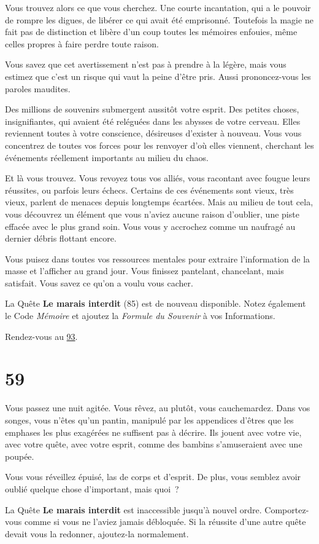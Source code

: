 \documentclass{report}
\newcommand{\gsection}[1]{
    \section{#1}
    \label{section-#1}
}
\newcommand{\glink}[1]{\hyperref[section-#1]{#1}}
\begin{document}
Vous trouvez alors ce que vous cherchez. Une courte incantation, qui a le pouvoir de rompre les digues, de libérer ce qui avait été emprisonné. Toutefois la magie ne fait pas de distinction et libère d'un coup toutes les mémoires enfouies, même celles propres à faire perdre toute raison.

Vous savez que cet avertissement n'est pas à prendre à la légère, mais vous estimez que c'est un risque qui vaut la peine d'être pris. Aussi prononcez-vous les paroles maudites.

Des millions de souvenirs submergent aussitôt votre esprit. Des petites choses, insignifiantes, qui avaient été reléguées dans les abysses de votre cerveau. Elles reviennent toutes à votre conscience, désireuses d'exister à nouveau. Vous vous concentrez de toutes vos forces pour les renvoyer d'où elles viennent, cherchant les événements réellement importants au milieu du chaos.

Et là vous trouvez. Vous revoyez tous vos alliés, vous racontant avec fougue leurs réussites, ou parfois leurs échecs. Certains de  ces événements sont vieux, très vieux, parlent de menaces depuis longtemps écartées. Mais au milieu de tout cela, vous découvrez un élément que vous n'aviez aucune raison d'oublier, une piste effacée avec le plus grand soin. Vous vous y accrochez comme un naufragé au dernier débris flottant encore.

Vous puisez dans toutes vos ressources mentales pour extraire l'information de la masse et l'afficher au grand jour. Vous finissez pantelant, chancelant, mais satisfait. Vous savez ce qu'on a voulu vous cacher.

La Quête \textbf{Le marais interdit} (85) est de nouveau disponible. Notez également le Code \emph{Mémoire} et ajoutez la \emph{Formule du Souvenir} à vos Informations.

Rendez-vous au \glink{93}.

\gsection{59}

Vous passez une nuit agitée. Vous rêvez, au plutôt, vous cauchemardez. Dans vos songes, vous n'êtes qu'un pantin, manipulé par les appendices d'êtres que les emphases les plus exagérées ne suffisent pas à décrire. Ils jouent avec votre vie, avec votre quête, avec votre esprit, comme des bambins s'amuseraient avec une poupée.

Vous vous réveillez épuisé, las de corps et d'esprit. De plus, vous semblez avoir oublié quelque chose d'important, mais quoi ?

La Quête \textbf{Le marais interdit} est inaccessible jusqu'à nouvel ordre. Comportez-vous comme si vous ne l'aviez jamais débloquée. Si la réussite d'une autre quête devait vous la redonner, ajoutez-la normalement.
\end{document}
